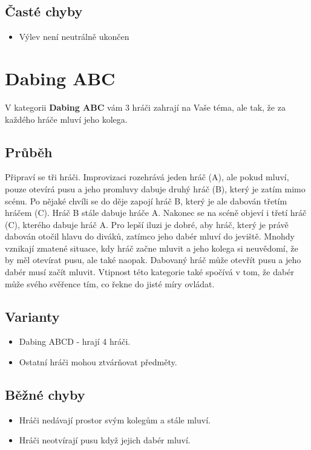 \subsection{ Časté chyby } \begin{itemize}
\item  Výlev není neutrálně ukončen
\end{itemize}
 
 
 
 
 
\needspace{5cm} \section{Dabing ABC} \label{dabing abc}  
 
V kategorii \textbf{Dabing ABC}{} vám 3 hráči zahrají na Vaše téma, ale tak, že za každého hráče mluví jeho kolega. 
 
\subsection{Průběh} Připraví se tři hráči. Improvizaci rozehrává jeden hráč (A), ale pokud mluví, pouze otevírá pusu a jeho promluvy dabuje druhý hráč (B), který je zatím mimo scénu. Po nějaké chvíli se do děje zapojí hráč B, který je ale dabován třetím hráčem (C). Hráč B stále dabuje hráče A. Nakonec se na scéně objeví i třetí hráč (C), kterého dabuje hráč A. Pro lepší iluzi je dobré, aby hráč, který je právě dabován otočil hlavu do diváků, zatímco jeho dabér mluví do jeviště. Mnohdy vznikají zmatené situace, kdy hráč začne mluvit a jeho kolega si neuvědomí, že by měl otevírat pusu, ale také naopak. Dabovaný hráč může otevřít pusu a jeho dabér musí začít mluvit. Vtipnost této kategorie také spočívá v tom, že dabér může svého svěřence tím, co řekne do jisté míry ovládat. 
 
\subsection{ Varianty } \begin{itemize}
\item Dabing ABCD - hrají 4 hráči.
\item Ostatní hráči mohou ztvárňovat předměty.
\end{itemize}
 
\subsection{ Běžné chyby } \begin{itemize}
\item Hráči nedávají prostor svým kolegům a stále mluví.
\item Hráči neotvírají pusu když jejich dabér mluví.
\end{itemize}
 
